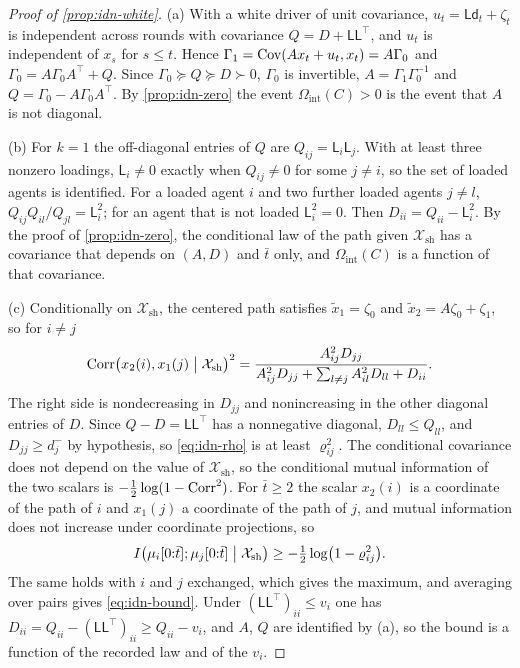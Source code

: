 \begin{proof}[Proof of \cref{prop:idn-white}]
(a) With a white driver of unit covariance, $u_t=\mathsf L\mathsf d_t+\zeta_t$ is independent across rounds with covariance $Q=D+\mathsf L\mathsf L^{\top}$, and $u_t$ is independent of $x_s$ for $s\le t$. Hence $\Gamma_1=\operatorname{Cov}(Ax_t+u_t,x_t)=A\Gamma_0$ and $\Gamma_0=A\Gamma_0A^{\top}+Q$. Since $\Gamma_0\succeq Q\succeq D\succ0$, $\Gamma_0$ is invertible, $A=\Gamma_1\Gamma_0^{-1}$ and $Q=\Gamma_0-A\Gamma_0A^{\top}$. By \cref{prop:idn-zero} the event $\Omega_{\mathrm{int}}(C)>0$ is the event that $A$ is not diagonal.

(b) For $k=1$ the off-diagonal entries of $Q$ are $Q_{ij}=\mathsf L_i\mathsf L_j$. With at least three nonzero loadings, $\mathsf L_i\neq0$ exactly when $Q_{ij}\neq0$ for some $j\neq i$, so the set of loaded agents is identified. For a loaded agent $i$ and two further loaded agents $j\neq l$, $Q_{ij}Q_{il}/Q_{jl}=\mathsf L_i^2$; for an agent that is not loaded $\mathsf L_i^2=0$. Then $D_{ii}=Q_{ii}-\mathsf L_i^2$. By the proof of \cref{prop:idn-zero}, the conditional law of the path given $\mathcal X_{\mathrm{sh}}$ has a covariance that depends on $(A,D)$ and $\bar t$ only, and $\Omega_{\mathrm{int}}(C)$ is a function of that covariance.

(c) Conditionally on $\mathcal X_{\mathrm{sh}}$, the centered path satisfies $\tilde x_1=\zeta_0$ and $\tilde x_2=A\zeta_0+\zeta_1$, so for $i\neq j$
\begin{equation}\label{eq:idn-rho}
\operatorname{Corr}\bigl(x_2(i),x_1(j)\bigm|\mathcal X_{\mathrm{sh}}\bigr)^2=\frac{A_{ij}^2D_{jj}}{A_{ij}^2D_{jj}+\sum_{l\neq j}A_{il}^2D_{ll}+D_{ii}}.
\end{equation}
The right side is nondecreasing in $D_{jj}$ and nonincreasing in the other diagonal entries of $D$. Since $Q-D=\mathsf L\mathsf L^{\top}$ has a nonnegative diagonal, $D_{ll}\le Q_{ll}$, and $D_{jj}\ge d_j^-$ by hypothesis, so \cref{eq:idn-rho} is at least $\varrho_{ij}^2$. The conditional covariance does not depend on the value of $\mathcal X_{\mathrm{sh}}$, so the conditional mutual information of the two scalars is $-\tfrac12\log(1-\operatorname{Corr}^2)$. For $\bar t\ge2$ the scalar $x_2(i)$ is a coordinate of the path of $i$ and $x_1(j)$ a coordinate of the path of $j$, and mutual information does not increase under coordinate projections, so
\begin{equation}\label{eq:idn-pairbound}
I\bigl(\mu_i[0{:}\bar t];\mu_j[0{:}\bar t]\bigm|\mathcal X_{\mathrm{sh}}\bigr)\ge-\tfrac12\log\bigl(1-\varrho_{ij}^2\bigr).
\end{equation}
The same holds with $i$ and $j$ exchanged, which gives the maximum, and averaging over pairs gives \cref{eq:idn-bound}. Under $(\mathsf L\mathsf L^{\top})_{ii}\le v_i$ one has $D_{ii}=Q_{ii}-(\mathsf L\mathsf L^{\top})_{ii}\ge Q_{ii}-v_i$, and $A$, $Q$ are identified by (a), so the bound is a function of the recorded law and of the $v_i$.
\end{proof}

